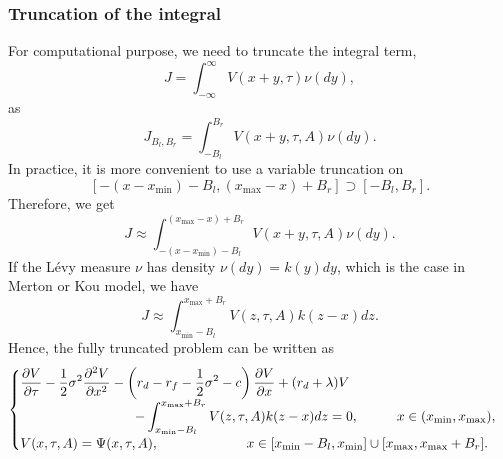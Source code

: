 \subsubsection{Truncation of the integral}
For computational purpose, we need to truncate the integral term,
$$J = \int_{-\infty}^\infty V(x+y,\tau)\nu(dy),$$
as
$$J_{B_l,B_r} = \int_{-B_l}^{B_r} V(x+y,\tau,A)\nu(dy).$$
In practice, it is more convenient to use a variable truncation on $$[-(x-x_{\min})-B_l, (x_{\max}-x)+B_r] \supset [-B_l,B_r].$$
Therefore, we get
$$J\approx \int_{-(x-x_{\min})-B_l}^{(x_{\max}-x)+B_r} V(x+y,\tau,A)\nu(dy).$$
If the L\'evy measure $\nu$ has density $\nu(dy) = k(y) dy$, which is the case in Merton or Kou model, we have 
$$J\approx \int_{x_{\min}-B_l}^{x_{\max}+B_r} V(z,\tau,A)k(z-x)dz.$$
Hence, the fully truncated problem can be written as
$$\begin{cases}
\displaystyle{\frac{\partial V}{\partial \tau}-\frac{1}{2}\sigma^2\frac{\partial^2V}{\partial x^2}-\left(r_d-r_f-\frac{1}{2}\sigma^2-c\right)\frac{\partial V}{\partial x}+(r_d + \lambda) V} \\
\hspace{3cm}\displaystyle{-\int_{x_{\min}-B_l}^{x_{\max}+B_r} V(z,\tau,A)k(z-x)dz = 0}, \hspace{1cm} x\in(x_{\min},x_{\max}),\\
V(x,\tau,A) = \Psi(x,\tau,A), \hspace{2.3cm} x \in [x_{\min}-B_l,x_{\min}]\cup[x_{\max},x_{\max}+B_r].
\end{cases}$$

